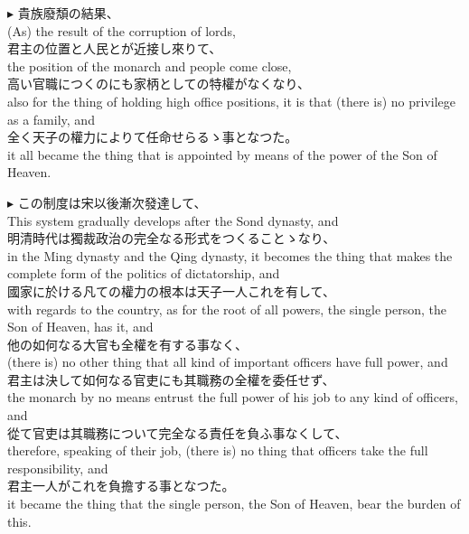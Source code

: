 \documentclass{ctexart}
\makeatletter
\newcommand*{\shifttext}[1]{%
  \settowidth{\@tempdima}{#1}%
  \hspace{-\@tempdima}#1%
}
\newcommand{\plabel}[1]{%
\shifttext{\textbf{#1}\quad}%
}
\makeatother
\begin{document}
\vspace{1em}
\plabel{$\blacktriangleright$}%
貴族廢頽の結果、\\
(As) the result of the corruption of lords,\\
君主の位置と人民とが近接し來りて、\\
the position of the monarch and people come close,\\
高い官職につくのにも家柄としての特權がなくなり、\\
also for the thing of holding high office positions, it is that (there is) no privilege as a family, and\\
全く天子の權力によりて任命せらるゝ事となつた。\\
it all became the thing that is appointed by means of the power of the Son of Heaven.

\vspace{1em}
\plabel{$\blacktriangleright$}%
この制度は宋以後漸次發達して、\\
This system gradually develops after the Sond dynasty, and\\
明清時代は獨裁政治の完全なる形式をつくることゝなり、\\
in the Ming dynasty and the Qing dynasty, it becomes the thing that makes the complete form of the politics of dictatorship, and\\
國家に於ける凡ての權力の根本は天子一人これを有して、\\
with regards to the country, as for the root of all powers, the single person, the Son of Heaven, has it, and\\
他の如何なる大官も全權を有する事なく、\\
(there is) no other thing that all kind of important officers have full power, and\\
君主は決して如何なる官吏にも其職務の全權を委任せず、\\
the monarch by no means entrust the full power of his job to any kind of officers, and\\
從て官吏は其職務について完全なる責任を負ふ事なくして、\\
therefore, speaking of their job, (there is) no thing that officers take the full responsibility, and\\
君主一人がこれを負擔する事となつた。\\
it became the thing that the single person, the Son of Heaven, bear the burden of this.
\end{document}
